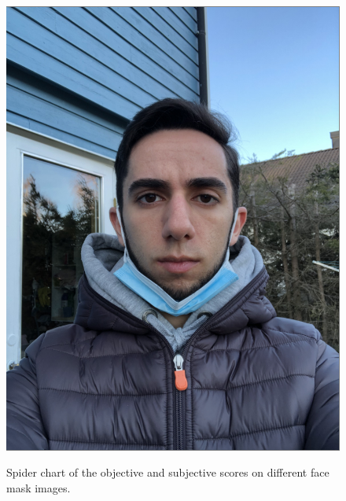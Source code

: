\begin{figure}[H]
        {\includegraphics[scale = 0.09]{figures/1152.png}\hspace{0.4cm}}
    \caption{Spider chart of the objective and subjective scores on different face mask images.}
    \label{fig:spiderMask}
\end{figure}
\newpage

